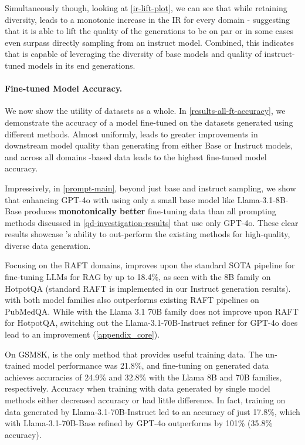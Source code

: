 

Simultaneously though, looking at \cref{ir-lift-plot}, we can see that while retaining diversity, \Sys{} leads to a monotonic increase in the IR for every domain - suggesting that it is able to lift the quality of the generations to be on par or in some cases even surpass directly sampling from an instruct model. Combined, this indicates that \Sys{} is capable of leveraging the diversity of base models and quality of instruct-tuned models in its end generations.




\paragraph{Fine-tuned Model Accuracy.} We now show the utility of \Sys{} datasets as a whole. In \cref{results-all-ft-accuracy}, we demonstrate the accuracy of a model fine-tuned on the datasets generated using different methods. Almost uniformly, \Sys{} leads to greater improvements in downstream model quality than generating from either Base or Instruct models, and across all domains \Sys{}-based data leads to the highest fine-tuned model accuracy.

Impressively, in \cref{prompt-main}, beyond just base and instruct sampling, we show that enhancing GPT-4o with \Sys{} using only a small base model like Llama-3.1-8B-Base produces \textbf{monotonically better} fine-tuning data than all prompting methods discussed in \cref{qd-investigation-results} that use only GPT-4o. These clear results showcase \Sys{}'s ability to out-perform the existing methods for high-quality, diverse data generation.

Focusing on the RAFT domains, \Sys{} improves upon the standard SOTA pipeline for fine-tuning LLMs for RAG by up to 18.4\%, as seen with the 8B family on HotpotQA (standard RAFT is implemented in our Instruct generation results). \Sys{} with both model families also outperforms existing RAFT pipelines on PubMedQA. While \Sys{} with the Llama 3.1 70B family does not improve upon RAFT for HotpotQA, switching out the Llama-3.1-70B-Instruct refiner for GPT-4o does lead to an improvement (\cref{appendix_core}).

On GSM8K, \Sys{} is the only method that provides useful training data. The un-trained model performance was 21.8\%, and fine-tuning on \Sys{} generated data achieves accuracies of 24.9\% and 32.8\% with the Llama 8B and 70B families, respectively. Accuracy when training with data generated by single model methods either decreased accuracy or had little difference. In fact, training on data generated by Llama-3.1-70B-Instruct led to an accuracy of just 17.8\%, which \Sys{} with Llama-3.1-70B-Base refined by GPT-4o outperforms by 101\% (35.8\% accuracy).

